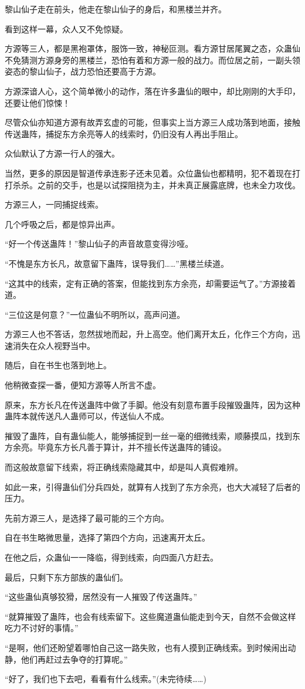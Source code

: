 \begin{this_body}
黎山仙子走在前头，他走在黎山仙子的身后，和黑楼兰并齐。

看到这样一幕，众人又不免惊疑。

方源等三人，都是黑袍罩体，服饰一致，神秘叵测。看方源甘居尾翼之态，众蛊仙不免猜测方源身旁的黑楼兰，恐怕有着和方源一般的战力。而位居之前，一副头领姿态的黎山仙子，战力恐怕还要高于方源。

方源深谙人心，这个简单微小的动作，落在许多蛊仙的眼中，却比刚刚的大手印，还要让他们惊悚！

尽管众仙亦知道方源有故弄玄虚的可能，但事实上当方源三人成功落到地面，接触传送蛊阵，捕捉东方余亮等人的线索时，仍旧没有人再出手阻止。

众仙默认了方源一行人的强大。

当然，更多的原因是智道传承连影子还未见着。众位蛊仙也都精明，犯不着现在打打杀杀。之前的交手，也是以试探阻挠为主，并未真正展露底牌，也未全力攻伐。

方源三人，一同捕捉线索。

几个呼吸之后，都是惊异出声。

“好一个传送蛊阵！”黎山仙子的声音故意变得沙哑。

“不愧是东方长凡，故意留下蛊阵，误导我们……”黑楼兰续道。

“这其中的线索，定有正确的答案，但能找到东方余亮，却需要运气了。”方源接着道。

“三位这是何意？”一位蛊仙不明所以，高声问道。

方源三人也不答话，忽然拔地而起，升上高空。他们离开太丘，化作三个方向，迅速消失在众人视野当中。

随后，自在书生也落到地上。

他稍微查探一番，便知方源等人所言不虚。

原来，东方长凡在传送蛊阵中做了手脚。他没有刻意布置手段摧毁蛊阵，因为这种蛊阵本就传送凡人蛊师可以，传送仙人不成。

摧毁了蛊阵，自有蛊仙能人，能够捕捉到一丝一毫的细微线索，顺藤摸瓜，找到东方余亮。毕竟东方长凡善于算计，并不擅长传送蛊阵的铺设。

而这般故意留下线索，将正确线索隐藏其中，却是叫人真假难辨。

如此一来，引得蛊仙们分兵四处，就算有人找到了东方余亮，也大大减轻了后者的压力。

先前方源三人，是选择了最可能的三个方向。

自在书生略微思量，选择了第四个方向，迅速离开太丘。

在他之后，众蛊仙一一降临，得到线索，向四面八方赶去。

最后，只剩下东方部族的蛊仙们。

“这些蛊仙真够狡猾，居然没有一人摧毁了传送蛊阵。”

“就算摧毁了蛊阵，也会有线索留下。这些魔道蛊仙能走到今天，自然不会做这样吃力不讨好的事情。”

“是啊，他们还盼望着哪怕自己这一路失败，也有人摸到正确线索。到时候闹出动静，他们再赶过去争夺的打算呢。”

“好了，我们也下去吧，看看有什么线索。”(未完待续……)

\end{this_body}

